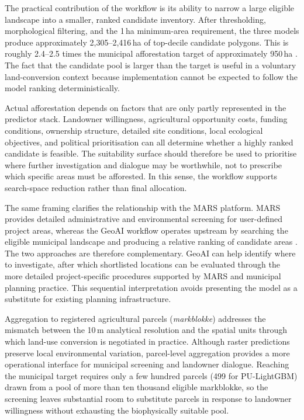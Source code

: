 \documentclass[land,article,submit,moreauthors]{Definitions/mdpi}
\begin{document}
The practical contribution of the workflow is its ability to narrow a large eligible landscape into a smaller, ranked candidate inventory. After thresholding, morphological filtering, and the 1\,ha minimum-area requirement, the three models produce approximately 2{,}305--2{,}416\,ha of top-decile candidate polygons. This is roughly 2.4--2.5 times the municipal afforestation target of approximately 950\,ha \citep{viborg2022}. The fact that the candidate pool is larger than the target is useful in a voluntary land-conversion context because implementation cannot be expected to follow the model ranking deterministically.

Actual afforestation depends on factors that are only partly represented in the predictor stack. Landowner willingness, agricultural opportunity costs, funding conditions, ownership structure, detailed site conditions, local ecological objectives, and political prioritisation can all determine whether a highly ranked candidate is feasible. The suitability surface should therefore be used to prioritise where further investigation and dialogue may be worthwhile, not to prescribe which specific areas must be afforested. In this sense, the workflow supports search-space reduction rather than final allocation.

The same framing clarifies the relationship with the MARS platform. MARS provides detailed administrative and environmental screening for user-defined project areas, whereas the GeoAI workflow operates upstream by searching the eligible municipal landscape and producing a relative ranking of candidate areas \citep{marsvejledning}. The two approaches are therefore complementary. GeoAI can help identify where to investigate, after which shortlisted locations can be evaluated through the more detailed project-specific procedures supported by MARS and municipal planning practice. This sequential interpretation avoids presenting the model as a substitute for existing planning infrastructure.

Aggregation to registered agricultural parcels (\textit{markblokke}) addresses the mismatch between the 10\,m analytical resolution and the spatial units through which land-use conversion is negotiated in practice. Although raster predictions preserve local environmental variation, parcel-level aggregation provides a more operational interface for municipal screening and landowner dialogue. Reaching the municipal target requires only a few hundred parcels (499 for PU-LightGBM) drawn from a pool of more than ten thousand eligible markblokke, so the screening leaves substantial room to substitute parcels in response to landowner willingness without exhausting the biophysically suitable pool.
\end{document}
